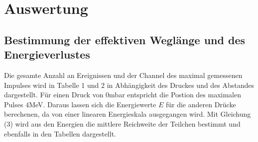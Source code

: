 \section{Auswertung}
\label{sec:Auswertung}
\subsection{Bestimmung der effektiven Weglänge und des Energieverlustes}
Die gesamte Anzahl an Ereignissen und der Channel des maximal gemessenen Impulses wird in Tabelle 1 und 2 in Abhängigkeit des Druckes und
des Abstandes dargestellt. Für einen Druck von $0$mbar entspricht die Postion des maximalen Pulses $4$MeV. Daraus lassen sich die Energiewerte $E$ für die
anderen Drücke berechenen, da von einer linearen Energieskala ausgegangen wird. Mit Gleichung (3) wird aus den Energien die mittlere Reichweite
der Teilchen bestimmt und ebenfalls in den Tabellen dargestellt.


